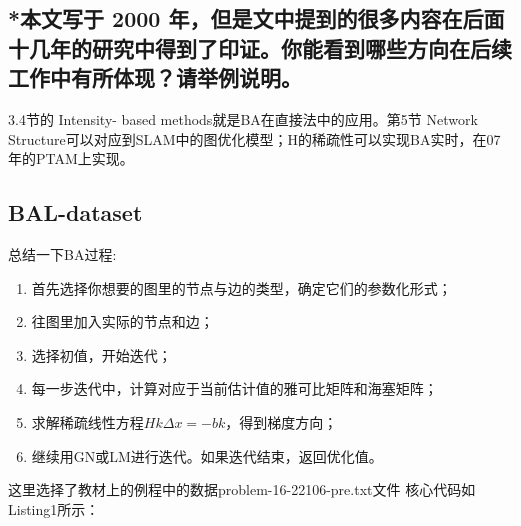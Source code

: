 \documentclass[40pt,a4paper，UTF8]{ctexart}
\numberwithin{equation}{section}
\begin{document}
\subsection{*本⽂写于 2000 年，但是⽂中提到的很多内容在后⾯⼗⼏年的研究中得到了印证。你能看到哪些⽅向在后续⼯作中有所体现？请举例说明。}
3.4节的 Intensity- based methods就是BA在直接法中的应用。第5节 Network Structure可以对应到SLAM中的图优化模型；H的稀疏性可以实现BA实时，在07年的PTAM上实现。


\subsection{BAL-dataset}
总结一下BA过程:
\begin{enumerate}
\item 首先选择你想要的图里的节点与边的类型，确定它们的参数化形式；

\item 往图里加入实际的节点和边；

\item 选择初值，开始迭代；

\item 每一步迭代中，计算对应于当前估计值的雅可比矩阵和海塞矩阵；

\item 求解稀疏线性方程$Hk\Delta x=-bk$，得到梯度方向；

\item 继续用GN或LM进行迭代。如果迭代结束，返回优化值。
\end{enumerate}

这里选择了教材上的例程中的数据problem-16-22106-pre.txt文件
核心代码如Listing1所示：
\end{document}
